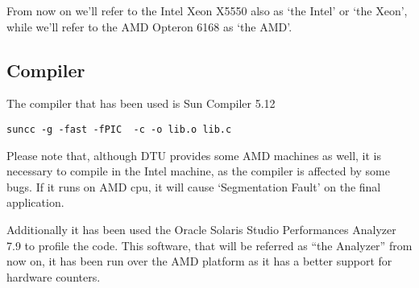 \vspace{0.5cm}

From now on we’ll refer to the Intel Xeon X5550 also as ‘the Intel’ or ‘the Xeon’, while we’ll refer to the AMD Opteron 6168 as ‘the AMD’.

\subsection{Compiler} 

The compiler that has been used is Sun Compiler 5.12 

\begin{lstlisting}
suncc -g -fast -fPIC  -c -o lib.o lib.c
\end{lstlisting}

Please note that, although DTU provides some AMD machines as well, it is necessary to compile in the Intel machine, as the compiler is affected by some bugs. If it runs on AMD cpu, it will cause ‘Segmentation Fault’ on the final application.

Additionally it has been used the Oracle Solaris Studio Performances Analyzer 7.9 to profile the code. This software, that will be referred as “the Analyzer” from now on, it has been run over the AMD platform as it has a better support for hardware counters.
